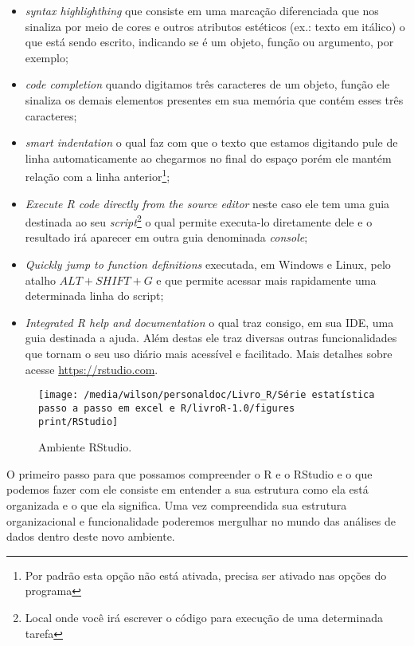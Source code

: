 \documentclass[14pt,titlepage, oneside, openany, a4paper]{book}
\providecommand{\tightlist}{%
  \setlength{\itemsep}{0pt}\setlength{\parskip}{0pt}}
\begin{document}
\begin{itemize}
\tightlist
\item
  \emph{syntax highlighthing} que consiste em uma marcação diferenciada que nos sinaliza por meio de cores e outros atributos estéticos (ex.: texto em itálico) o que está sendo escrito, indicando se é um objeto, função ou argumento, por exemplo;
\item
  \emph{code completion} quando digitamos três caracteres de um objeto, função ele sinaliza os demais elementos presentes em sua memória que contém esses três caracteres;
\item
  \emph{smart indentation} o qual faz com que o texto que estamos digitando pule de linha automaticamente ao chegarmos no final do espaço porém ele mantém relação com a linha anterior\footnote{Por padrão esta opção não está ativada, precisa ser ativado nas opções do programa};
\item
  \emph{Execute R code directly from the source editor} neste caso ele tem uma guia destinada ao seu \emph{script}\footnote{Local onde você irá escrever o código para execução de uma determinada tarefa} o qual permite executa-lo diretamente dele e o resultado irá aparecer em outra guia denominada \emph{console};
\item
  \emph{Quickly jump to function definitions} executada, em Windows e Linux, pelo atalho \(ALT + SHIFT + G\) e que permite acessar mais rapidamente uma determinada linha do script;
\item
  \emph{Integrated R help and documentation} o qual traz consigo, em sua IDE, uma guia destinada a ajuda. Além destas ele traz diversas outras funcionalidades que tornam o seu uso diário mais acessível e facilitado. Mais detalhes sobre acesse \url{https://rstudio.com}.
\end{itemize}

\begin{figure}[H]

{\centering \texttt{[image: /media/wilson/personaldoc/Livro\_R/Série estatística passo a passo em excel e R/livroR-1.0/figures print/RStudio]} 

}

\caption{Ambiente RStudio.}\label{fig:RStudio}
\end{figure}

O primeiro passo para que possamos compreender o R e o RStudio e o que podemos fazer com ele consiste em entender a sua estrutura como ela está organizada e o que ela significa. Uma vez compreendida sua estrutura organizacional e funcionalidade poderemos mergulhar no mundo das análises de dados dentro deste novo ambiente.
\end{document}
